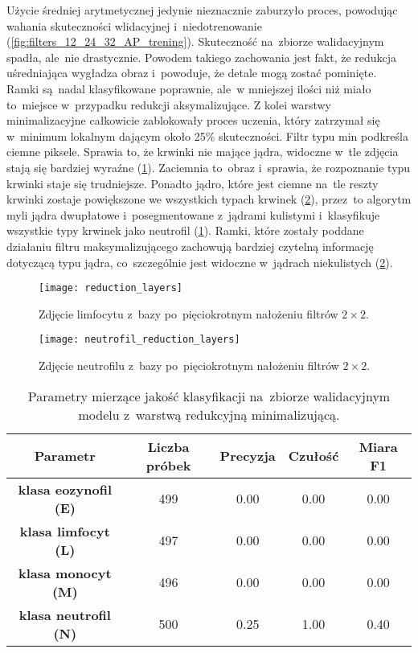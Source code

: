 {\parindent0pt
Użycie średniej arytmetycznej jedynie nieznacznie zaburzyło proces, powodując wahania skuteczności wlidacyjnej i~niedotrenowanie (\ref{fig:filters_12_24_32_AP_trening}). Skuteczność na~zbiorze walidacyjnym spadła, ale~nie drastycznie. Powodem takiego zachowania jest fakt, że redukcja uśredniająca wygładza obraz i~powoduje, że detale mogą zostać pominięte. Ramki są~nadal klasyfikowane poprawnie, ale~w mniejszej ilości niż miało to~miejsce w~przypadku redukcji aksymalizujące. Z kolei warstwy minimalizacyjne całkowicie zablokowały proces uczenia, który zatrzymał się w~minimum lokalnym dającym około 25\% skuteczności. Filtr typu min podkreśla ciemne piksele. Sprawia to, że krwinki nie mające jądra, widoczne w~tle zdjęcia stają się bardziej wyraźne (\ref{fig:reduction_layers}). Zaciemnia to~obraz i~sprawia, że rozpoznanie typu krwinki staje się trudniejsze. Ponadto jądro, które jest ciemne na~tle reszty krwinki zostaje powiększone we wszystkich typach krwinek (\ref{fig:neutrofil_reduction_layers}), przez~to algorytm myli jądra dwupłatowe i~posegmentowane z~jądrami kulistymi i~klasyfikuje wszystkie typy krwinek jako neutrofil (\ref{tab:min_red_layers_params_val}). Ramki, które zostały poddane działaniu filtru maksymalizującego zachowują bardziej czytelną informację dotyczącą typu jądra, co~szczególnie jest widoczne w~jądrach niekulistych (\ref{fig:neutrofil_reduction_layers}).

\begin{figure}[h!]
	\centering
	\centering
		\texttt{[image: reduction\_layers]}	
	\caption{Zdjęcie limfocytu z~bazy po~pięciokrotnym nałożeniu filtrów $2\times2$.}	\label{fig:reduction_layers}
\end{figure}

\begin{figure}[h!]
	\centering
	\centering
		\texttt{[image: neutrofil\_reduction\_layers]}	
	\caption{Zdjęcie neutrofilu z~bazy po~pięciokrotnym nałożeniu filtrów $2\times2$.}\label{fig:neutrofil_reduction_layers}
\end{figure}

\begin{table}[h!]
\centering
\caption[Short Heading]{Parametry mierzące jakość klasyfikacji na~zbiorze walidacyjnym modelu z~warstwą redukcyjną minimalizującą.}
\label{tab:min_red_layers_params_val}
\begin{tabular}{|c|c|c|c|c|}
\hline
\textbf{Parametr}                             & \textbf{Liczba próbek}  & \textbf{Precyzja} & \textbf{Czułość} & \textbf{Miara F1}  \\ \hline
\textbf{klasa eozynofil (E)} & 499 & 0.00   & 0.00   & 0.00  \\ \hline
\textbf{klasa limfocyt (L)}& 497 & 0.00   & 0.00   & 0.00  \\ \hline
\textbf{klasa monocyt (M)} & 496 & 0.00   & 0.00   & 0.00  \\ \hline
\textbf{klasa neutrofil (N)} & 500 & 0.25   & 1.00    & 0.40   \\ \hline
\end{tabular}
\end{table}
}

